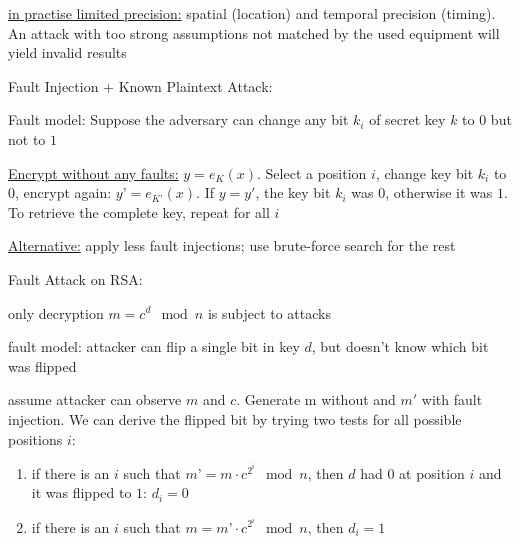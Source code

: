 \documentclass[landscape, a4paper]{article}
\begin{document}
\begin{minipage}[t]{0.2\linewidth}
\begin{betterlist}
\begin{betterlist}
			\begin{betterlist}
				\item \underline{in practise limited precision:} spatial (location) and temporal precision (timing). An attack with too strong assumptions not matched by the used equipment will yield invalid results
			\end{betterlist}
			\item \alert{Fault Injection + Known Plaintext Attack:}
			\begin{betterlist}
				\item \alert{Fault model:} Suppose the adversary can change any bit $k_i$ of secret key $k$ to $0$ but not to $1$
				\item \underline{Encrypt without any faults:} $y = e_K(x)$. Select a position $i$, change key bit $k_i$ to $0$, encrypt again: $y’ = e_{K’}(x)$. If $y = y'$, the key bit $k_i$ was $0$, otherwise it was $1$. To retrieve the complete key, repeat for all $i$
				\begin{betterlist}
					\item \underline{Alternative:} apply less fault injections; use brute-force search for the rest
				\end{betterlist}
			\end{betterlist}
			\item \alert{Fault Attack on RSA:}
			\begin{betterlist}
				\item only decryption $m = c^d \mod n$ is subject to attacks
				\item \alert{fault model:} attacker can flip a single bit in key $d$, but doesn’t know which bit was flipped
				\item assume attacker can observe $m$ and $c$. Generate m without and $m'$ with fault injection. We can derive the flipped bit by trying two tests for all possible positions $i$:
				\begin{enumerate}
					\item if there is an $i$ such that $m’ = m \cdot c^{2^i} \mod n$, then $d$ had $0$ at position $i$ and it was flipped to $1$: $d_i = 0$
					\item if there is an $i$ such that $m = m’ \cdot c^{2^i} \mod n$, then $d_i = 1$
				\end{enumerate}
			\end{betterlist}
		\end{betterlist}
	\end{betterlist}
	\fbox{Test Infrastructure}
	\begin{betterlist}

\end{betterlist}
\end{minipage}
\end{document}
